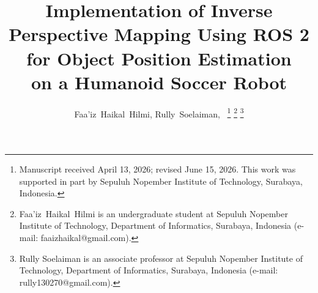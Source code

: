 \documentclass[journal]{IAENGtran}
\begin{document}
%
\title{Implementation of Inverse Perspective Mapping Using ROS 2 for Object Position Estimation \\ on a Humanoid Soccer Robot}
%
%
%

\author{Faa'iz~Haikal~Hilmi,
        Rully~Soelaiman,~%
\thanks{Manuscript received April 13, 2026; revised June 15, 2026. This
work was supported in part by Sepuluh Nopember Institute of Technology,
Surabaya, Indonesia.}
\thanks{Faa'iz~Haikal~Hilmi is an undergraduate student at Sepuluh Nopember Institute
of Technology, Department of Informatics, Surabaya, Indonesia (e-mail:
faaizhaikal@gmail.com).}%
\thanks{Rully Soelaiman is an associate professor at Sepuluh Nopember Institute
of Technology, Department of Informatics, Surabaya, Indonesia (e-mail:
rully130270@gmail.com).
}
}%



%
%



%
\end{document}
